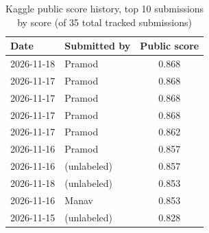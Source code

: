\begin{table}[t]
\caption{Kaggle public score history, top 10 submissions by score (of 35 total tracked submissions)}
\label{tab:p1-kaggle-history}
\centering\small
\begin{tabular}{llc}
\toprule
Date & Submitted by & Public score \\
\midrule
2026-11-18 & Pramod & 0.868 \\
2026-11-17 & Pramod & 0.868 \\
2026-11-17 & Pramod & 0.868 \\
2026-11-17 & Pramod & 0.868 \\
2026-11-17 & Pramod & 0.862 \\
2026-11-16 & Pramod & 0.857 \\
2026-11-16 & (unlabeled) & 0.857 \\
2026-11-18 & (unlabeled) & 0.853 \\
2026-11-16 & Manav & 0.853 \\
2026-11-15 & (unlabeled) & 0.828 \\
\bottomrule
\end{tabular}
\end{table}
